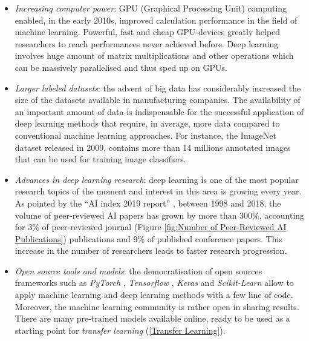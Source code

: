 \begin{itemize}
    \item \emph{Increasing computer power}: GPU (Graphical Processing Unit) computing enabled, in the early 2010s, improved calculation performance in the field of machine learning. Powerful, fast and cheap GPU-devices greatly helped researchers to reach performances never achieved before. Deep learning involves huge amount of matrix multiplications and other operations which can be massively parallelised and thus sped up on GPUs.
    \item \emph{Larger labeled datasets}: the advent of big data has considerably increased the size of the datasets available in manufacturing companies. The availability of an important amount of data is indispensable for the successful application of deep learning methods that require, in average, more data compared to conventional machine learning approaches. For instance, the ImageNet dataset \citep{deng2009imagenet} released in 2009, contains more than 14 millions annotated images that can be used for training image classifiers.
    \item \emph{Advances in deep learning research}: deep learning is one of the most popular research topics of the moment and interest in this area is growing every year. As pointed by the ``AI index 2019 report''  \citep{zhang2021ai}, between 1998 and 2018, the volume of peer-reviewed AI papers has grown by more than 300\%, accounting for 3\% of peer-reviewed journal (Figure \ref{fig:Number of Peer-Reviewed AI Publications}) publications and 9\% of published conference papers. This increase in the number of researchers leads to faster research progression. 
    \item \emph{Open source tools and models}: the democratisation of open sources frameworks such as \textit{PyTorch} \citep{paszke2019pytorch}, \textit{Tensorflow} \citep{tensorflow2015-whitepaper}, \textit{Keras} \citep{chollet2015keras} and \textit{Scikit-Learn} \citep{scikit-learn} allow to apply machine learning and deep learning methods with a few line of code. Moreover, the machine learning community is rather open in sharing results. There are many pre-trained models available online, ready to be used as a starting point for \textit{transfer learning} (\ref{Transfer Learning}).  
\end{itemize}

